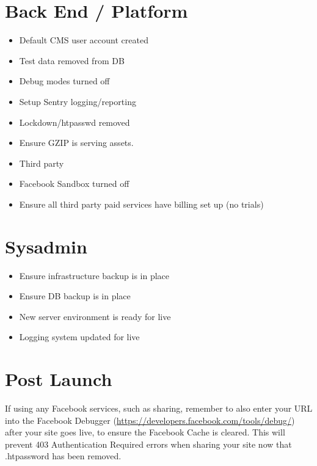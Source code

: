 \documentclass[letterpaper,10pt,english]{sphinxmanual}
\begin{document}
\section{Back End / Platform}
\label{prelaunch_checklist:back-end-platform}\begin{itemize}
\item {} 
Default CMS user account created

\item {} 
Test data removed from DB

\item {} 
Debug modes turned off

\item {} 
Setup Sentry logging/reporting

\item {} 
Lockdown/htpasswd removed

\item {} 
Ensure GZIP is serving assets.

\item {} 
Third party

\item {} 
Facebook Sandbox turned off

\item {} 
Ensure all third party paid services have billing set up (no trials)

\end{itemize}


\section{Sysadmin}
\label{prelaunch_checklist:sysadmin}\begin{itemize}
\item {} 
Ensure infrastructure backup is in place

\item {} 
Ensure DB backup is in place

\item {} 
New server environment is ready for live

\item {} 
Logging system updated for live

\end{itemize}


\section{Post Launch}
\label{prelaunch_checklist:post-launch}
If using any Facebook services, such as sharing, remember to also enter your URL into the Facebook Debugger (\href{https://developers.facebook.com/tools/debug/}{https://developers.facebook.com/tools/debug/}) after your site goes live, to ensure the Facebook Cache is cleared. This will prevent 403 Authentication Required errors when sharing your site now that .htpassword has been removed.
\end{document}
